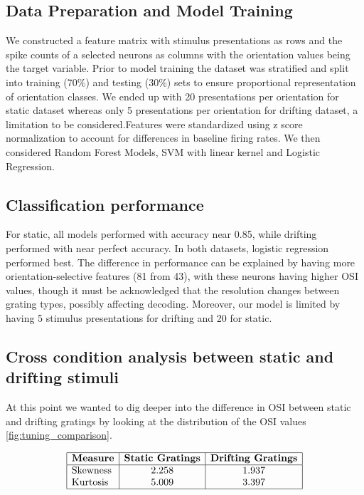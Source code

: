 \documentclass[10pt,twocolumn]{article}
\begin{document}
\subsection{Data Preparation and Model Training}
We constructed a feature matrix with stimulus presentations as rows and the spike counts of a selected neurons as columns with the orientation values being the target variable. Prior to model training the dataset was stratified and split into training (70\%) and testing (30\%) sets to ensure proportional representation of orientation classes. We ended up with 20 presentations per orientation for static dataset whereas only 5 presentations per orientation for drifting dataset, a limitation to be considered.Features were standardized using z score normalization to account for differences in baseline firing rates. We then considered Random Forest Models, SVM with linear kernel and Logistic Regression.

\subsection{Classification performance}

For static, all models performed with accuracy near 0.85, while drifting performed with near perfect accuracy. In both datasets, logistic regression performed best. The difference in performance can be explained by having more orientation-selective features (81 from 43), with these neurons having higher OSI values, though it must be acknowledged that the resolution changes between grating types, possibly affecting decoding. Moreover, our model is limited by having 5 stimulus presentations for drifting and 20 for static.

\subsection{Cross condition analysis between static and drifting stimuli}

At this point we wanted to dig deeper into the difference in OSI between static and drifting gratings by looking at the distribution of the OSI values \ref{fig:tuning_comparison}. 

\[
\begin{array}{|l|c|c|}
\hline
\textbf{Measure} & \textbf{Static Gratings} & \textbf{Drifting Gratings} \\
\hline
\text{Skewness} & 2.258 & 1.937 \\
\text{Kurtosis} & 5.009 & 3.397 \\
\hline
\end{array}
\]
\end{document}
